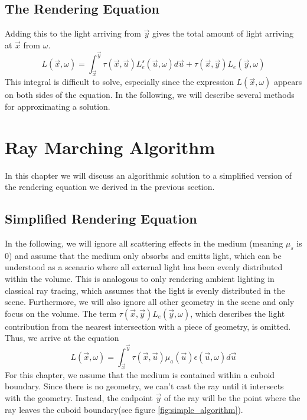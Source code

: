 \subsection{The Rendering Equation}
Adding this to the light arriving from $\vec{y}$ gives the total amount of light arriving at $\vec{x}$ from $\omega $.
\begin{equation}
L(\vec{x}, \omega ) = {\int_{\vec{x}}^{\vec{y}} \tau(\vec{x}, \vec{u})L_e^s(\vec{u}, \omega )d\vec{u}} + \tau(\vec{x}, \vec{y}) L_e(\vec{y}, \omega )
\end{equation}
This integral is difficult to solve, especially since the expression $L(\vec{x}, \omega )$ appears on both sides of the equation.
In the following, we will describe several methods for approximating a solution.




\section{Ray Marching Algorithm}
In this chapter we will discuss an algorithmic solution\cite{511, 10.1145/147130.147155} to a simplified version of the rendering equation we derived in the previous section.
\subsection{Simplified Rendering Equation}
In the following, we will ignore all scattering effects in the medium (meaning $\mu_s $ is 0) and assume that the medium only absorbs and emitts light\cite{10.1145/147130.147155}, which can be understood as a scenario where all external light has been evenly distributed within the volume. This is analogous to only rendering ambient lighting in classical ray tracing, which assumes that the light is evenly distributed in the scene.
Furthermore, we will also ignore all other geometry in the scene and only focus on the volume. The term $\tau(\vec{x}, \vec{y}) L_e(\vec{y}, \omega )$, which describes the light contribution from the nearest intersection with a piece of geometry, is omitted.
Thus, we arrive at the equation
\begin{equation} \label{eq:simplified_req}
L(\vec{x}, \omega ) = \int_{\vec{x}}^{\vec{y}} \tau(\vec{x}, \vec{u}){\mu}_a(\vec{u})\epsilon (\vec{u}, \omega)d\vec{u}
\end{equation}
For this chapter, we assume that the medium is contained within a cuboid boundary\cite{10.1145/147130.147155, 10.1145/78964.78965}. Since there is no geometry, we can't cast the ray until it intersects with the geometry. Instead, the endpoint $\vec{y}$ of the ray will be the point where the ray leaves the cuboid boundary(see figure \ref{fig:simple_algorithm}).

